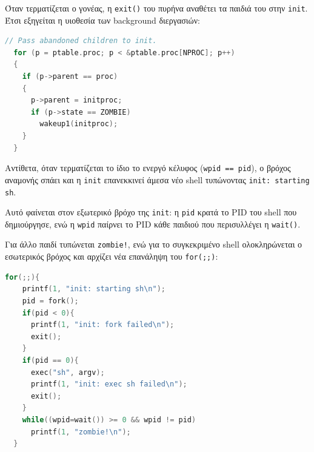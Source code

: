 \documentclass[11pt,a4paper]{article}
\begin{document}
Όταν τερματίζεται ο γονέας, η \texttt{exit()} του πυρήνα αναθέτει τα παιδιά του στην
\texttt{init}. Έτσι εξηγείται η υιοθεσία των background διεργασιών:
\begin{lstlisting}[language=C, caption={Υιοθεσία ορφανών διεργασιών στην exit του kernel/proc.c}]
  // Pass abandoned children to init.
  for (p = ptable.proc; p < &ptable.proc[NPROC]; p++)
  {
    if (p->parent == proc)
    {
      p->parent = initproc;
      if (p->state == ZOMBIE)
        wakeup1(initproc);
    }
  }
\end{lstlisting}

Αντίθετα, όταν τερματίζεται το ίδιο το ενεργό κέλυφος (\texttt{wpid == pid}), 
ο βρόχος αναμονής σπάει και η \texttt{init} επανεκκινεί άμεσα νέο shell τυπώνοντας \texttt{init: starting sh}.

Αυτό φαίνεται στον εξωτερικό βρόχο της \texttt{init}: η \texttt{pid} κρατά το PID του
shell που δημιούργησε, ενώ η \texttt{wpid} παίρνει το PID κάθε παιδιού που περισυλλέγει
η \texttt{wait()}. 

Για άλλο παιδί τυπώνεται \texttt{zombie!}, ενώ για το συγκεκριμένο
shell ολοκληρώνεται ο εσωτερικός βρόχος και αρχίζει νέα επανάληψη του \texttt{for(;;)}:

\begin{lstlisting}[language=C, caption={Δημιουργία shell και περισυλλογή παιδιών στο user/init.c}]
  for(;;){
    printf(1, "init: starting sh\n");
    pid = fork();
    if(pid < 0){
      printf(1, "init: fork failed\n");
      exit();
    }
    if(pid == 0){
      exec("sh", argv);
      printf(1, "init: exec sh failed\n");
      exit();
    }
    while((wpid=wait()) >= 0 && wpid != pid)
      printf(1, "zombie!\n");
  }
\end{lstlisting}
\end{document}
